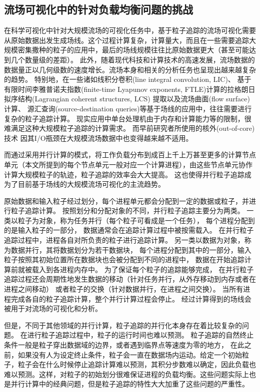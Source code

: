 \subsection{流场可视化中的针对负载均衡问题的挑战}
在科学可视化中针对大规模流场的可视化任务中，基于粒子追踪的流场可视化需要从原始数据出发生成场线。这个过程计算复杂，计算量大，而且在一些需要追踪大规模密集撒种的粒子的应用中，最后的场线规模往往比原始数据更大（甚至可能达到几个数量级的差距）。
此外，随着现代科技和计算技术的高速发展，流场数据的数据量正以几何级数的速度增长。流场本身和相关的分析任务也呈现出越来越复杂的趋势。
特别地，在一些诸如线积分卷积(line integral convolution, LIC)\parencite{CabralL93,ShenK97}、
基于有限时间李雅普诺夫指数(finite-time Lyapunov exponents, FTLE)计算的拉格朗日拟序结构(Lagrangian coherent structures, LCS)
提取\parencite{GarthGTH07,Haller2001}以及流场曲面(flow surface)计算\parencite{EdmundsLCMZW12}、
源汇查询(source-destination queries)\parencite{KendallWAPHE11}等基于场线的应用中，往往需要进行复杂的粒子追踪计算。
现实应用中单台处理机由于内存和计算能力等的限制，很难满足这种大规模粒子追踪的计算需求。
而早前研究者所使用的核外(out-of-core)技术\parencite{BruckschenKHJ01,EllsworthGM04,silva2002out}
因其I/O瓶颈在大规模流场数据中也变得越来越不适用。

而通过采用并行计算的模式，将工作负载分布到成百上千上万甚至更多的计算节点单元（本文所提到的每个节点单元一般对应一个计算进程），由这些节点单元协作计算大规模粒子的轨迹，粒子追踪的效率会大大提高。
这也使得并行粒子追踪成为了目前基于场线的大规模流场可视化的主流趋势。

原始数据和输入粒子经过划分，每个进程单元都会分配到一定的数据或粒子，并进行粒子追踪计算。
按照划分和分配对象的不同，并行粒子追踪主要分为两类。
一类以粒子为对象，称为任务并行（每个粒子可看成是一个任务），
每个进程分配到的是输入粒子的一部分，
数据通常会在追踪计算过程中被按需载入。
在并行粒子追踪过程中，进程各自对所负责的粒子进行追踪计算。
另一类以数据为对象，称为数据并行，其将数据划分为若干数据块，
每个进程分配到其中的一部分，输入粒子按照其初始位置所在数据块也会被分配到不同的进程中，
数据在开始追踪计算前就被载入到各进程内存中。
为了保证每个粒子的追踪能够完成，
在并行粒子追踪过程还会周期性地发生数据的移动（针对任务并行，从外存移动到内存或者在进程之间移动）
或者粒子的交换（针对数据并行，在进程之间交换）。
当所有进程完成各自的粒子追踪计算，整个并行计算过程会停止。
经过计算得到的场线会被用于对流场的可视化和分析。


但是，不同于其他领域的并行计算，粒子追踪的并行化本身存在着比较复杂的问题。 
在进行粒子追踪过程中，粒子的运行时间也难以预测。
粒子追踪的自然终止条件一般是粒子穿出数据域的边界，或者遇到临界点等速度为零的地方，
在此之前，如果没有人为设定终止条件，粒子会一直在数据场内运动。给定一个初始粒子，粒子会在什么时候停止追踪计算难以预测，其积分步数难以确定，因此负载也难以预测。这样，对粒子的初始划分很难保证进程的负载均衡。这些问题实际上也是并行计算中的经典问题，但是粒子追踪的特性大大加重了这些问题的严重性。

